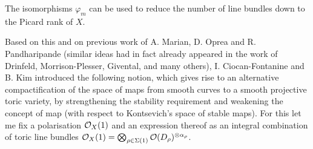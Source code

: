 \begin{rmk}
 The isomorphisms $\varphi_m$ can be used to reduce the number of line bundles down to the Picard rank of $X$.
\end{rmk}

Based on this and on previous work of A. Marian, D. Oprea and R. Pandharipande \cite{MOP} (similar ideas had in fact already appeared in the work of Drinfeld, Morrison-Plesser, Givental, and many others), I. Ciocan-Fontanine and B. Kim introduced the following notion, which gives rise to an alternative compactification of the space of maps from smooth curves to a smooth projective toric variety, by strengthening the stability requirement and weakening the concept of map (with respect to Kontsevich's space of stable maps). For this let me fix a polarisation $\mathcal{O}_X(1)$ and an expression thereof as an integral combination of toric line bundles $\mathcal{O}_X(1)=\bigotimes_{\rho\in\Sigma(1)}\mathcal{O}(D_\rho)^{\otimes \alpha_\rho}$.

